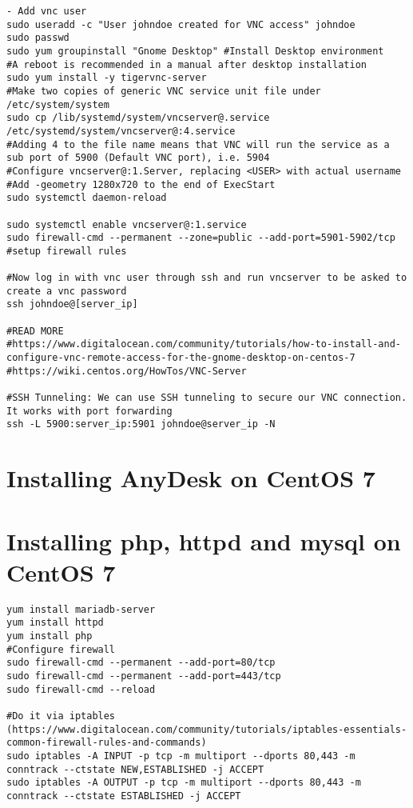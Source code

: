 \documentclass{article}
\begin{document}
\begin{lstlisting}
- Add vnc user
sudo useradd -c "User johndoe created for VNC access" johndoe
sudo passwd
sudo yum groupinstall "Gnome Desktop" #Install Desktop environment
#A reboot is recommended in a manual after desktop installation
sudo yum install -y tigervnc-server
#Make two copies of generic VNC service unit file under /etc/system/system
sudo cp /lib/systemd/system/vncserver@.service /etc/systemd/system/vncserver@:4.service
#Adding 4 to the file name means that VNC will run the service as a sub port of 5900 (Default VNC port), i.e. 5904
#Configure vncserver@:1.Server, replacing <USER> with actual username
#Add -geometry 1280x720 to the end of ExecStart
sudo systemctl daemon-reload

sudo systemctl enable vncserver@:1.service
sudo firewall-cmd --permanent --zone=public --add-port=5901-5902/tcp #setup firewall rules

#Now log in with vnc user through ssh and run vncserver to be asked to create a vnc password
ssh johndoe@[server_ip]

#READ MORE
#https://www.digitalocean.com/community/tutorials/how-to-install-and-configure-vnc-remote-access-for-the-gnome-desktop-on-centos-7
#https://wiki.centos.org/HowTos/VNC-Server

#SSH Tunneling: We can use SSH tunneling to secure our VNC connection. It works with port forwarding
ssh -L 5900:server_ip:5901 johndoe@server_ip -N

\end{lstlisting}

\section{Installing AnyDesk on CentOS 7}

\section{Installing php, httpd and mysql on CentOS 7}
\begin{verbatim}
yum install mariadb-server
yum install httpd
yum install php
#Configure firewall
sudo firewall-cmd --permanent --add-port=80/tcp
sudo firewall-cmd --permanent --add-port=443/tcp
sudo firewall-cmd --reload

#Do it via iptables (https://www.digitalocean.com/community/tutorials/iptables-essentials-common-firewall-rules-and-commands)
sudo iptables -A INPUT -p tcp -m multiport --dports 80,443 -m conntrack --ctstate NEW,ESTABLISHED -j ACCEPT
sudo iptables -A OUTPUT -p tcp -m multiport --dports 80,443 -m conntrack --ctstate ESTABLISHED -j ACCEPT

\end{verbatim}
\end{document}
